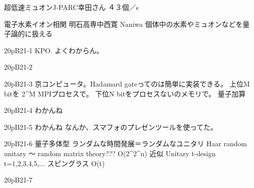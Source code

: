 \documentclass[a4paper,12pt]{jarticle}
\begin{document}
超低速ミュオンJ-PARC幸田さん
４３個／s


電子水素イオン相関
明石高専中西寛
Naniwa 個体中の水素やミュオンなどを量子論的に扱える



20pB21-1
KPO. よくわからん。

20pB21-2

20pB21-3
京コンピュータ。Hadamard gateってのは簡単に実装できる。
上位M bitを 2^M MPIプロセスで。
下位N bitをプロセスないのメモリで。
量子加算

20pB21-4
わかんね

20pB21-5
わかんね
なんか、スマフォのプレゼンツールを使ってた。

20pB21-6
量子多体型
ランダムな時間発展＝ランダムなユニタリ
Haar random unitary 〜 random matrix theory??? O(2^2^n)
近似 Unitary t-design t=1,2,3,4,5,...
スピングラス O(t)


20pB21-7
\end{document}
